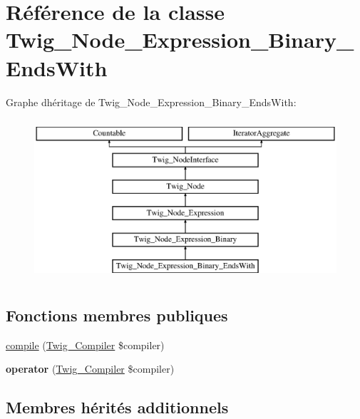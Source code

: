 \hypertarget{class_twig___node___expression___binary___ends_with}{}\section{Référence de la classe Twig\+\_\+\+Node\+\_\+\+Expression\+\_\+\+Binary\+\_\+\+Ends\+With}
\label{class_twig___node___expression___binary___ends_with}
Graphe d\textquotesingle{}héritage de Twig\+\_\+\+Node\+\_\+\+Expression\+\_\+\+Binary\+\_\+\+Ends\+With\+:\begin{figure}[H]
\begin{center}
\leavevmode
\includegraphics[height=6.000000cm]{class_twig___node___expression___binary___ends_with}
\end{center}
\end{figure}
\subsection*{Fonctions membres publiques}
\begin{DoxyCompactItemize}
\item 
\hyperlink{class_twig___node___expression___binary___ends_with_a4e0faa87c3fae583620b84d3607085da}{compile} (\hyperlink{class_twig___compiler}{Twig\+\_\+\+Compiler} \$compiler)
\item 
{\bfseries operator} (\hyperlink{class_twig___compiler}{Twig\+\_\+\+Compiler} \$compiler)\hypertarget{class_twig___node___expression___binary___ends_with_af77318ec88d5f8a508684970a150b670}{}\label{class_twig___node___expression___binary___ends_with_af77318ec88d5f8a508684970a150b670}

\end{DoxyCompactItemize}
\subsection*{Membres hérités additionnels}


